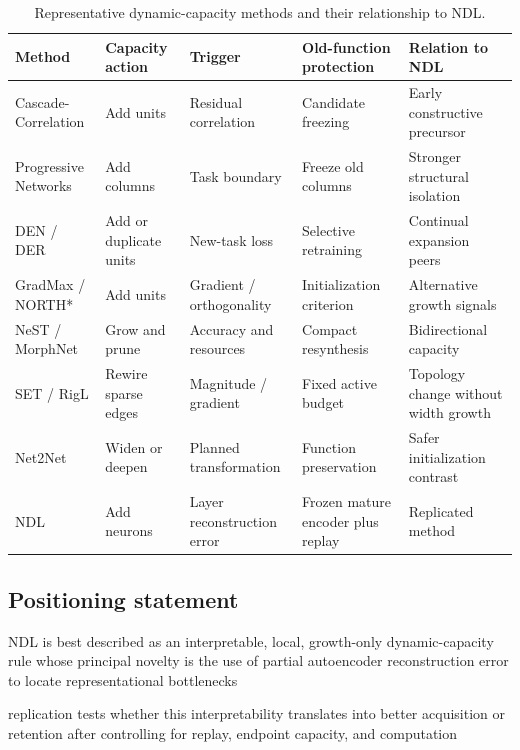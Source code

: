 \begin{table}[htbp]
\centering
\caption{Representative dynamic-capacity methods and their relationship to NDL.}
\label{tab:dynamic-capacity-methods}
\small
\begin{tabularx}{\textwidth}{p{2.7cm}p{2.4cm}p{2.8cm}YY}
\toprule
Method & Capacity action & Trigger & Old-function protection & Relation to NDL \\
\midrule
Cascade-Correlation & Add units & Residual correlation & Candidate freezing & Early constructive precursor \\
Progressive Networks & Add columns & Task boundary & Freeze old columns & Stronger structural isolation \\
DEN / DER & Add or duplicate units & New-task loss & Selective retraining & Continual expansion peers \\
GradMax / NORTH* & Add units & Gradient / orthogonality & Initialization criterion & Alternative growth signals \\
NeST / MorphNet & Grow and prune & Accuracy and resources & Compact resynthesis & Bidirectional capacity \\
SET / RigL & Rewire sparse edges & Magnitude / gradient & Fixed active budget & Topology change without width growth \\
Net2Net & Widen or deepen & Planned transformation & Function preservation & Safer initialization contrast \\
NDL & Add neurons & Layer reconstruction error & Frozen mature encoder plus replay & Replicated method \\
\bottomrule
\end{tabularx}
\end{table}

\subsection{Positioning statement}
\begin{draftpoints}
  \item NDL is best described as an interpretable, local, growth-only dynamic-capacity rule whose principal novelty is the use of partial autoencoder reconstruction error to locate representational bottlenecks \parencite{draelos2017neurogenesis}
  \item replication tests whether this interpretability translates into better acquisition or retention after controlling for replay, endpoint capacity, and computation
\end{draftpoints}
